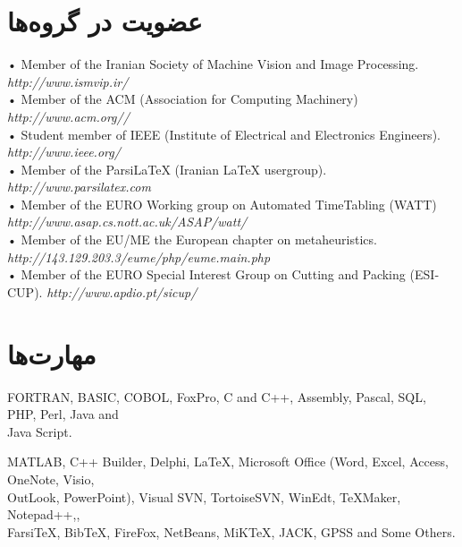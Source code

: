 \documentclass[11pt,a4paper]{bidimoderncv}
\begin{document}
\section{عضویت در گروه‌ها}
\begin{latin}
\begin{flushleft}
{\small • Member of the Iranian Society of Machine Vision and Image Processing. \hfill {\scriptsize\em http://www.ismvip.ir/}}\\
{\small • Member of the ACM (Association for Computing Machinery) \hfill {\scriptsize\em http://www.acm.org//}}\\
{\small • Student member of IEEE (Institute of Electrical and Electronics Engineers). \hfill {\scriptsize\em http://www.ieee.org/}}\\
{\small • Member of the ParsiLaTeX (Iranian \LaTeX{} usergroup). \hfill {\scriptsize\em http://www.parsilatex.com}}\\
{\small • Member of the EURO Working group on Automated TimeTabling (WATT) \hfill {\scriptsize\em http://www.asap.cs.nott.ac.uk/ASAP/watt/}}\\
{\small • Member of the EU/ME the European chapter on metaheuristics. \hfill {\scriptsize\em http://143.129.203.3/eume/php/eume.main.php}}\\
{\small • Member of the EURO Special Interest Group on Cutting and Packing (ESICUP). \hfill {\scriptsize\em http://www.apdio.pt/sicup/}}\\
\end{flushleft}
\end{latin}

\section{مهارت‌ها}
\begin{flushleft}
\begin{latin}
{FORTRAN, BASIC, COBOL, FoxPro, C and C++, Assembly, Pascal, SQL, PHP, Perl, Java and\\ Java Script.}
\end{latin}
\end{flushleft}
\begin{flushleft}
\begin{latin}
 MATLAB, C++ Builder, Delphi, \LaTeX, Microsoft Office (Word, Excel, Access, OneNote, Visio,\\ 
 OutLook, PowerPoint), Visual SVN, TortoiseSVN, WinEdt, TeXMaker, Notepad++,\XePersian, \\
 Farsi\TeX, Bib\TeX, FireFox, NetBeans, MiKTeX, JACK, GPSS and Some Others.
\end{latin}
\end{flushleft}
\end{document}
